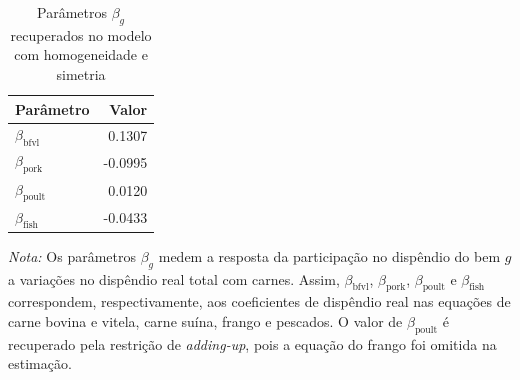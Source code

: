 
\begin{table}[H]
\centering
\caption{Parâmetros $\beta_g$ recuperados no modelo com homogeneidade e simetria}
\label{tab:beta-hsym}
\small
\begin{tabular}{@{}lr@{}}
\toprule
Parâmetro & Valor \\
\midrule
$\beta_{\text{bfvl}}$  & 0.1307 \\
$\beta_{\text{pork}}$  & -0.0995 \\
$\beta_{\text{poult}}$ & 0.0120 \\
$\beta_{\text{fish}}$  & -0.0433 \\
\bottomrule
\end{tabular}
\par\vspace{0.35em}
\begin{minipage}{0.92\textwidth}
\footnotesize
\textit{Nota:} Os parâmetros $\beta_g$ medem a resposta da participação no dispêndio do bem $g$ a variações no dispêndio real total com carnes. Assim, $\beta_{\text{bfvl}}$, $\beta_{\text{pork}}$, $\beta_{\text{poult}}$ e $\beta_{\text{fish}}$ correspondem, respectivamente, aos coeficientes de dispêndio real nas equações de carne bovina e vitela, carne suína, frango e pescados. O valor de $\beta_{\text{poult}}$ é recuperado pela restrição de \textit{adding-up}, pois a equação do frango foi omitida na estimação.
\end{minipage}
\end{table}

